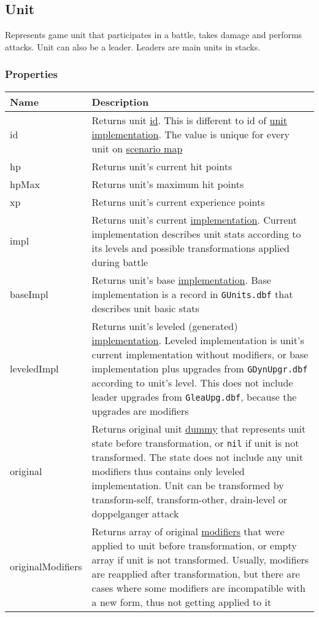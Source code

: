 \subsection{Unit}
\label{Unit}
Represents game unit that participates in a battle, takes damage and performs attacks. Unit can also be a leader. Leaders are main units in stacks.
\subsubsection{Properties}
\begin{center}
\begin{tabularx}{\linewidth}{| l | X |}
\hline
\textbf{Name} & \textbf{Description} \\
\hline
id & Returns unit \hyperref[Id]{id}. This is different to id of \hyperref[UnitImpl]{unit implementation}. The value is unique for every unit on \hyperref[Scenario]{scenario map}\\
\hline
hp & Returns unit's current hit points\\
\hline
hpMax & Returns unit's maximum hit points\\
\hline
xp & Returns unit's current experience points\\
\hline
impl & Returns unit's current \hyperref[UnitImpl]{implementation}. Current implementation describes unit stats according to its levels and possible transformations applied during battle\\
\hline
baseImpl & Returns unit's base \hyperref[UnitImpl]{implementation}. Base implementation is a record in \texttt{GUnits.dbf} that describes unit basic stats\\
\hline
leveledImpl & Returns unit's leveled (generated) \hyperref[UnitImpl]{implementation}. Leveled implementation is unit's current implementation without modifiers, or base implementation plus upgrades from \texttt{GDynUpgr.dbf} according to unit's level. This does not include leader upgrades from \texttt{GleaUpg.dbf}, because the upgrades are modifiers\\
\hline
original & Returns original unit \hyperref[UnitDummy]{dummy} that represents unit state before transformation, or \texttt{nil} if unit is not transformed. The state does not include any unit modifiers thus contains only leveled implementation. Unit can be transformed by transform-self, transform-other, drain-level or doppelganger attack\\
\hline
originalModifiers & Returns array of original \hyperref[Modifier]{modifiers} that were applied to unit before transformation, or empty array if unit is not transformed. Usually, modifiers are reapplied after transformation, but there are cases where some modifiers are incompatible with a new form, thus not getting applied to it\\
\hline
\end{tabularx}
\end{center}